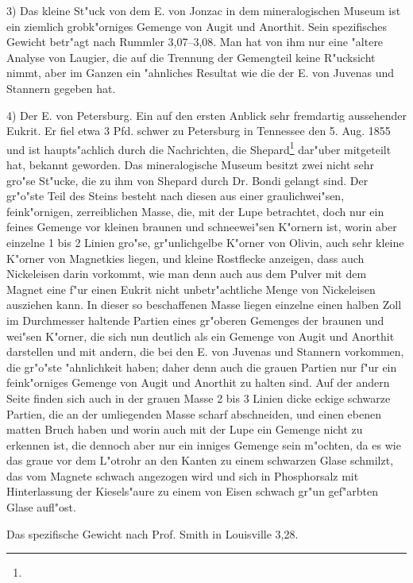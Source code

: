 \documentclass[a4paper, 11pt, oneside]{article}
\begin{document}
3) Das kleine St"uck von dem E. von Jonzac in dem mineralogischen Museum ist ein ziemlich grobk"orniges Gemenge von Augit und Anorthit. Sein spezifisches Gewicht betr"agt nach Rummler 3,07--3,08. Man hat von ihm nur eine "altere Analyse von Laugier, die auf die Trennung der Gemengteil keine R"ucksicht nimmt, aber im Ganzen ein "ahnliches Resultat wie die der E. von Juvenas und Stannern gegeben hat.

4) Der E. von Petersburg. Ein auf den ersten Anblick sehr fremdartig aussehender Eukrit. Er fiel etwa 3 Pfd. schwer zu Petersburg in Tennessee den 5. Aug. 1855 und ist haupts"achlich durch die Nachrichten, die Shepard\footnote{} dar"uber mitgeteilt hat, bekannt geworden. Das mineralogische Museum besitzt zwei nicht sehr gro"se St"ucke, die zu ihm von Shepard durch Dr. Bondi gelangt sind. Der gr"o"ste Teil des Steins besteht nach diesen aus einer graulichwei"sen, feink"ornigen, zerreiblichen Masse, die, mit der Lupe betrachtet, doch nur ein feines Gemenge vor kleinen braunen und schneewei"sen K"ornern ist, worin aber einzelne 1 bis 2 Linien gro"se, gr"unlichgelbe K"orner von Olivin, auch sehr kleine K"orner von Magnetkies liegen, und kleine Rostflecke anzeigen, dass auch Nickeleisen darin vorkommt, wie man denn auch aus dem Pulver mit dem Magnet eine f"ur einen Eukrit nicht unbetr"achtliche Menge von Nickeleisen ausziehen kann. In dieser so beschaffenen Masse liegen einzelne einen halben Zoll im Durchmesser haltende Partien eines gr"oberen Gemenges der braunen und wei"sen K"orner, die sich nun deutlich als ein Gemenge von Augit und Anorthit darstellen und mit andern, die bei den E. von Juvenas und Stannern vorkommen, die gr"o"ste "ahnlichkeit haben; daher denn auch die grauen Partien nur f"ur ein feink"orniges Gemenge von Augit und Anorthit zu halten sind. Auf der andern Seite finden sich auch in der grauen Masse 2 bis 3 Linien dicke eckige schwarze Partien, die an der umliegenden Masse scharf abschneiden, und einen ebenen matten Bruch haben und worin auch mit der Lupe ein Gemenge nicht zu erkennen ist, die dennoch aber nur ein inniges Gemenge sein m"ochten, da es wie das graue vor dem L"otrohr an den Kanten zu einem schwarzen Glase schmilzt, das vom Magnete schwach angezogen wird und sich in Phosphorsalz mit Hinterlassung der Kiesels"aure zu einem von Eisen schwach gr"un gef"arbten Glase aufl"ost.

Das spezifische Gewicht nach Prof. Smith in Louisville 3,28.
\end{document}
